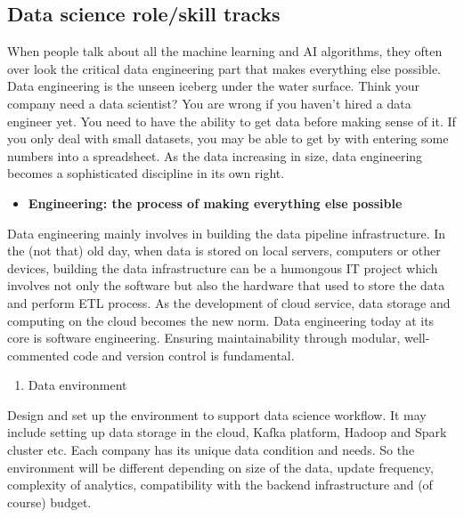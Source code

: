 \documentclass[12pt,]{krantz}
\providecommand{\tightlist}{%
  \setlength{\itemsep}{0pt}\setlength{\parskip}{0pt}}
\begin{document}
\hypertarget{data-science-roleskill-tracks}{%
\subsection{Data science role/skill tracks}\label{data-science-roleskill-tracks}}

When people talk about all the machine learning and AI algorithms, they often over look the critical data engineering part that makes everything else possible. Data engineering is the unseen iceberg under the water surface. Think your company need a data scientist? You are wrong if you haven't hired a data engineer yet. You need to have the ability to get data before making sense of it. If you only deal with small datasets, you may be able to get by with entering some numbers into a spreadsheet. As the data increasing in size, data engineering becomes a sophisticated discipline in its own right.

\begin{itemize}
\tightlist
\item
  \textbf{Engineering: the process of making everything else possible}
\end{itemize}

Data engineering mainly involves in building the data pipeline infrastructure. In the (not that) old day, when data is stored on local servers, computers or other devices, building the data infrastructure can be a humongous IT project which involves not only the software but also the hardware that used to store the data and perform ETL process. As the development of cloud service, data storage and computing on the cloud becomes the new norm. Data engineering today at its core is software engineering. Ensuring maintainability through modular, well-commented code and version control is fundamental.

\begin{enumerate}
\def\labelenumi{(\arabic{enumi})}
\tightlist
\item
  Data environment
\end{enumerate}

Design and set up the environment to support data science workflow. It may include setting up data storage in the cloud, Kafka platform, Hadoop and Spark cluster etc. Each company has its unique data condition and needs. So the environment will be different depending on size of the data, update frequency, complexity of analytics, compatibility with the backend infrastructure and (of course) budget.
\end{document}
